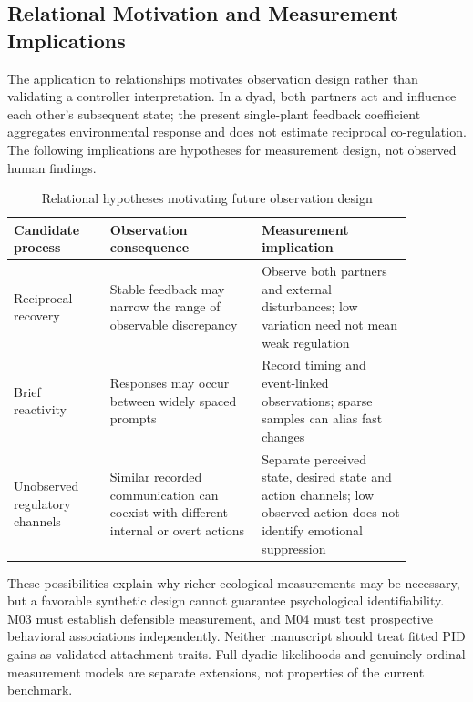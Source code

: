 \subsection{Relational Motivation and Measurement Implications}

The application to relationships motivates observation design rather than validating a controller interpretation. In a dyad, both partners act and influence each other's subsequent state; the present single-plant feedback coefficient aggregates environmental response and does not estimate reciprocal co-regulation. The following implications are hypotheses for measurement design, not observed human findings.

\begin{table}[htbp]
\centering
\caption{Relational hypotheses motivating future observation design}
\label{tab:m02-relational-implications}
\begin{tabular}{p{0.21\linewidth}p{0.33\linewidth}p{0.33\linewidth}}
\toprule
Candidate process & Observation consequence & Measurement implication \\
\midrule
Reciprocal recovery & Stable feedback may narrow the range of observable discrepancy & Observe both partners and external disturbances; low variation need not mean weak regulation \\
Brief reactivity & Responses may occur between widely spaced prompts & Record timing and event-linked observations; sparse samples can alias fast changes \\
Unobserved regulatory channels & Similar recorded communication can coexist with different internal or overt actions & Separate perceived state, desired state and action channels; low observed action does not identify emotional suppression \\
\bottomrule
\end{tabular}
\end{table}

These possibilities explain why richer ecological measurements may be necessary, but a favorable synthetic design cannot guarantee psychological identifiability. M03 must establish defensible measurement, and M04 must test prospective behavioral associations independently. Neither manuscript should treat fitted PID gains as validated attachment traits. Full dyadic likelihoods and genuinely ordinal measurement models are separate extensions, not properties of the current benchmark.
